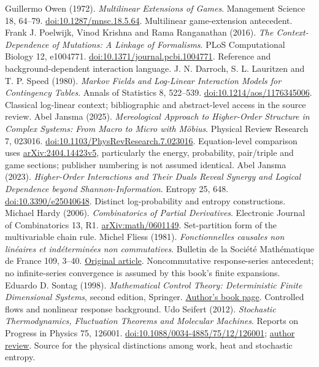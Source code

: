  Guillermo Owen (1972). \emph{Multilinear Extensions of Games}. Management Science 18, 64--79. \href{https://doi.org/10.1287/mnsc.18.5.64}{doi:10.1287/mnsc.18.5.64}. Multilinear game-extension antecedent.
 Frank J. Poelwijk, Vinod Krishna and Rama Ranganathan (2016). \emph{The Context-Dependence of Mutations: A Linkage of Formalisms}. PLoS Computational Biology 12, e1004771. \href{https://doi.org/10.1371/journal.pcbi.1004771}{doi:10.1371/journal.pcbi.1004771}. Reference and background-dependent interaction language.
 J. N. Darroch, S. L. Lauritzen and T. P. Speed (1980). \emph{Markov Fields and Log-Linear Interaction Models for Contingency Tables}. Annals of Statistics 8, 522--539. \href{https://doi.org/10.1214/aos/1176345006}{doi:10.1214/aos/1176345006}. Classical log-linear context; bibliographic and abstract-level access in the source review.
 Abel Jansma (2025). \emph{Mereological Approach to Higher-Order Structure in Complex Systems: From Macro to Micro with M\"obius}. Physical Review Research 7, 023016. \href{https://doi.org/10.1103/PhysRevResearch.7.023016}{doi:10.1103/PhysRevResearch.7.023016}. Equation-level comparison uses \href{https://arxiv.org/abs/2404.14423v5}{arXiv:2404.14423v5}, particularly the energy, probability, pair/triple and game sections; publisher numbering is not assumed identical.
 Abel Jansma (2023). \emph{Higher-Order Interactions and Their Duals Reveal Synergy and Logical Dependence beyond Shannon-Information}. Entropy 25, 648. \href{https://doi.org/10.3390/e25040648}{doi:10.3390/e25040648}. Distinct log-probability and entropy constructions.
 Michael Hardy (2006). \emph{Combinatorics of Partial Derivatives}. Electronic Journal of Combinatorics 13, R1. \href{https://arxiv.org/abs/math/0601149}{arXiv:math/0601149}. Set-partition form of the multivariable chain rule.
 Michel Fliess (1981). \emph{Fonctionnelles causales non lin\'eaires et ind\'etermin\'ees non commutatives}. Bulletin de la Soci\'et\'e Math\'ematique de France 109, 3--40. \href{https://www.numdam.org/item/BSMF_1981__109__3_0/}{Original article}. Noncommutative response-series antecedent; no infinite-series convergence is assumed by this book's finite expansions.
 Eduardo D. Sontag (1998). \emph{Mathematical Control Theory: Deterministic Finite Dimensional Systems}, second edition, Springer. \href{https://sontaglab.org/mct.html}{Author's book page}. Controlled flows and nonlinear response background.
 Udo Seifert (2012). \emph{Stochastic Thermodynamics, Fluctuation Theorems and Molecular Machines}. Reports on Progress in Physics 75, 126001. \href{https://doi.org/10.1088/0034-4885/75/12/126001}{doi:10.1088/0034-4885/75/12/126001}; \href{https://arxiv.org/abs/1205.4176}{author review}. Source for the physical distinctions among work, heat and stochastic entropy.
